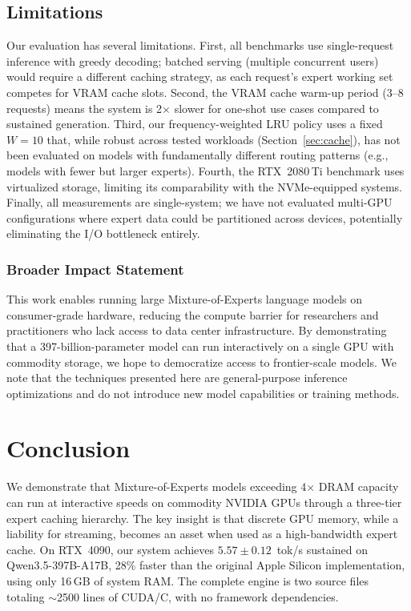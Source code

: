 \documentclass[10pt]{article}
\begin{document}
\subsection{Limitations}

Our evaluation has several limitations. First, all benchmarks use single-request inference with greedy decoding; batched serving (multiple concurrent users) would require a different caching strategy, as each request's expert working set competes for VRAM cache slots. Second, the VRAM cache warm-up period (3--8 requests) means the system is 2$\times$ slower for one-shot use cases compared to sustained generation. Third, our frequency-weighted LRU policy uses a fixed $W=10$ that, while robust across tested workloads (Section~\ref{sec:cache}), has not been evaluated on models with fundamentally different routing patterns (e.g., models with fewer but larger experts). Fourth, the RTX~2080\,Ti benchmark uses virtualized storage, limiting its comparability with the NVMe-equipped systems. Finally, all measurements are single-system; we have not evaluated multi-GPU configurations where expert data could be partitioned across devices, potentially eliminating the I/O bottleneck entirely.

\subsubsection*{Broader Impact Statement}

This work enables running large Mixture-of-Experts language models on consumer-grade hardware, reducing the compute barrier for researchers and practitioners who lack access to data center infrastructure. By demonstrating that a 397-billion-parameter model can run interactively on a single GPU with commodity storage, we hope to democratize access to frontier-scale models. We note that the techniques presented here are general-purpose inference optimizations and do not introduce new model capabilities or training methods.

\section{Conclusion}

We demonstrate that Mixture-of-Experts models exceeding 4$\times$ DRAM capacity can run at interactive speeds on commodity NVIDIA GPUs through a three-tier expert caching hierarchy. The key insight is that discrete GPU memory, while a liability for streaming, becomes an asset when used as a high-bandwidth expert cache. On RTX~4090, our system achieves $5.57 \pm 0.12$~tok/s sustained on Qwen3.5-397B-A17B, 28\% faster than the original Apple Silicon implementation, using only 16\,GB of system RAM. The complete engine is two source files totaling $\sim$2500 lines of CUDA/C, with no framework dependencies.



\end{document}
